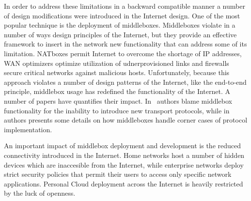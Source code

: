In order to address these limitations in a backward compatible manner a number
of design modifications were introduced in the Internet design. One of the most
popular technique is the deployment of middleboxes.
Middleboxes violate in a number of ways design principles of the Internet, but
they provide an effective framework to insert in the network
new functionality that can address some of its limitation. 
NATboxes permit Internet to overcome the shortage of IP
addresses, WAN optimizers optimize utilization of 
udnerprovisioned links and firewalls secure critical networks against
malicious hosts. Unfortunately, because this approach violates a number of
design patterns of the Internet, like the end-to-end principle, middlebox usage has
redefined the functionality of the Internet. A number of papers have quantifies
their impact. In~\cite{blah} authors blame middlebox
functionality for the inability to introduce new transport protocols, while
in~\cite{blah} authors presents some details on how middleboxes handle corner cases
of protocol implementation. 

An important impact of middlebox deployment and development is the reduced
connectivity introduced in the Internet. Home networks host a number of
hidden devices which are inaccesible from the Internet, while enterprise
networks deploy strict security policies that permit their users to access only
specific network applications. Personal Cloud deployment across the Internet is
heavily restricted by the luck of openness.



